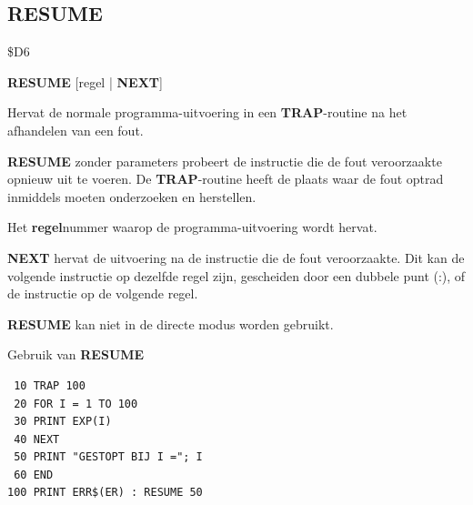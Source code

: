 
\newpage
\subsection{RESUME}
\begin{description}[leftmargin=2cm,style=nextline]
\item [Token:]    \$D6

\item [Formaat:]   {\bf RESUME} [regel | {\bf NEXT}]

\item [Gebruik:]    Hervat de normale programma-uitvoering in een {\bf TRAP}-routine na het afhandelen van een fout.

                  {\bf RESUME} zonder parameters probeert de instructie die de fout veroorzaakte opnieuw uit te voeren. De {\bf TRAP}-routine heeft de plaats waar de fout optrad inmiddels moeten onderzoeken en herstellen.

                  Het {\bf regel}nummer waarop de programma-uitvoering wordt hervat.

                  {\bf NEXT} hervat de uitvoering na de instructie die de fout veroorzaakte. Dit kan de volgende instructie op dezelfde regel zijn, gescheiden door een dubbele punt (:), of de instructie op de volgende regel.

\item [Opmerkingen:]  {\bf RESUME} kan niet in de directe modus worden gebruikt.

\item [Voorbeeld:]  Gebruik van {\bf RESUME}

\begin{tcolorbox}[colback=black,coltext=white]
\verbatimfont{\codefont}
\begin{verbatim}
 10 TRAP 100
 20 FOR I = 1 TO 100
 30 PRINT EXP(I)
 40 NEXT
 50 PRINT "GESTOPT BIJ I ="; I
 60 END
100 PRINT ERR$(ER) : RESUME 50
\end{verbatim}
\end{tcolorbox}
\end{description}


\newpage
